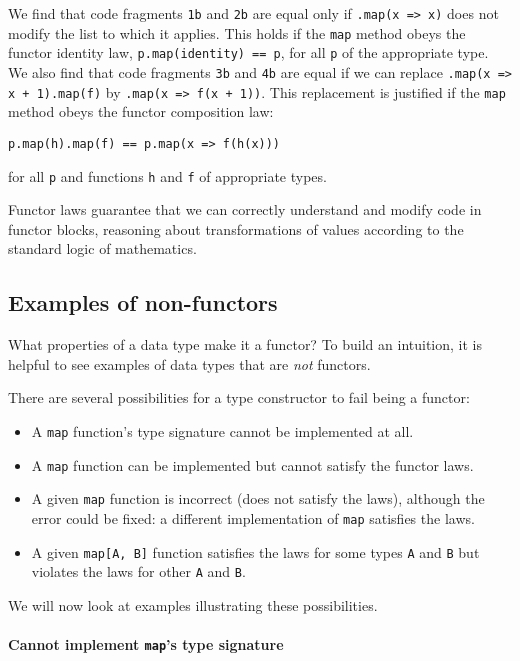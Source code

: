 We find that code fragments \lstinline!1b! and \lstinline!2b! are
equal only if \lstinline!.map(x => x)! does not modify the list to
which it applies. This holds if the \lstinline!map! method obeys
the functor identity law, \lstinline!p.map(identity) == p!, for all
\lstinline!p! of the appropriate type. We also find that code fragments
\lstinline!3b! and \lstinline!4b! are equal if we can replace \lstinline!.map(x => x + 1).map(f)!
by \lstinline!.map(x => f(x + 1))!. This replacement is justified
if the \lstinline!map! method obeys the functor composition law:
\begin{lstlisting}
p.map(h).map(f) == p.map(x => f(h(x)))
\end{lstlisting}
for all \lstinline!p! and functions \lstinline!h! and \lstinline!f!
of appropriate types.

Functor laws guarantee that we can correctly understand and modify
code in functor blocks, reasoning about transformations of values
according to the standard logic of mathematics.

\subsection{Examples of non-functors\label{subsec:Examples-of-non-functors}}

What properties of a data type make it a functor? To build an intuition,
it is helpful to see examples of data types that are \emph{not} functors.

There are several possibilities for a type constructor to fail being
a functor:
\begin{itemize}
\item A \lstinline!map! function\textsf{'}s type signature cannot be implemented
at all.
\item A \lstinline!map! function can be implemented but cannot satisfy
the functor laws.
\item A given \lstinline!map! function is incorrect (does not satisfy the
laws), although the error could be fixed: a different implementation
of \lstinline!map! satisfies the laws.
\item A given \lstinline!map[A, B]! function satisfies the laws for some
types \lstinline!A! and \lstinline!B! but violates the laws for
other \lstinline!A! and \lstinline!B!.
\end{itemize}
We will now look at examples illustrating these possibilities.

\paragraph{Cannot implement \texttt{map}\textsf{'}s type signature}

